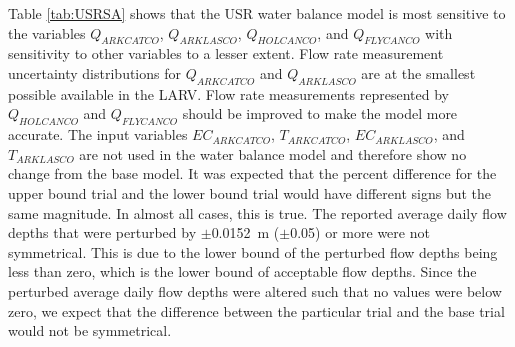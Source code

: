 Table \ref{tab:USRSA} shows that the USR water balance model is most sensitive to the variables $ Q_{ARKCATCO} $, $ Q_{ARKLASCO} $, $ Q_{HOLCANCO} $, and $ Q_{FLYCANCO} $ with sensitivity to other variables to a lesser extent.  Flow rate measurement uncertainty distributions for $ Q_{ARKCATCO} $ and $ Q_{ARKLASCO} $ are at the smallest possible available in the LARV.  Flow rate measurements represented by $ Q_{HOLCANCO} $ and $ Q_{FLYCANCO} $ should be improved to make the model more accurate.  The input variables $ EC_{ARKCATCO} $, $ T_{ARKCATCO} $, $ EC_{ARKLASCO} $, and $ T_{ARKLASCO} $ are not used in the water balance model and therefore show no change from the base model.  It was expected that the percent difference for the upper bound trial and the lower bound trial would have different signs but the same magnitude.  In almost all cases, this is true.  The reported average daily flow depths that were perturbed by $\pm$\SI{0.0152}{\meter} ($\pm$\SI{0.05}{\foot}) or more were not symmetrical.  This is due to the lower bound of the perturbed flow depths being less than zero, which is the lower bound of acceptable flow depths.  Since the perturbed average daily flow depths were altered such that no values were below zero, we expect that the difference between the particular trial and the base trial would not be symmetrical.

